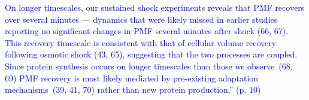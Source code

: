 \documentclass[11pt, letterpaper]{article}%
\newcommand{\revised}{\textcolor{blue}}
\begin{document}
\begin{itemize}
\begin{mdframed}
\footnotesize\revised{On longer timescales, our sustained shock experiments reveals that PMF recovers over several minutes --- dynamics that were likely missed in earlier studies reporting no significant changes in PMF several minutes after shock (66, 67). This recovery timescale is consistent with that of cellular volume recovery following osmotic shock (43, 65), suggesting that the two processes are coupled. Since protein synthesis occurs on longer timescales than those we observe~(68, 69) PMF recovery is most likely mediated by pre-existing adaptation mechanisms~(39, 41, 70) rather than new protein production.'' (p. 10)}
\end{mdframed}
\end{itemize}
\end{document}
